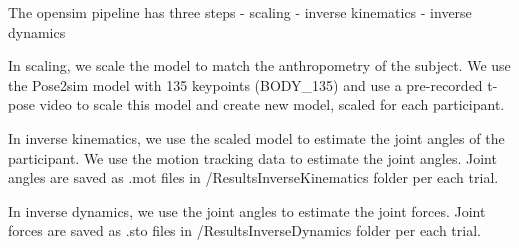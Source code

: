 \documentclass[
  letterpaper,
  DIV=11,
  numbers=noendperiod]{scrreprt}
\begin{document}
The opensim pipeline has three steps - scaling - inverse kinematics -
inverse dynamics

In scaling, we scale the model to match the anthropometry of the
subject. We use the Pose2sim model with 135 keypoints (BODY\_135) and
use a pre-recorded t-pose video to scale this model and create new
model, scaled for each participant.

In inverse kinematics, we use the scaled model to estimate the joint
angles of the participant. We use the motion tracking data to estimate
the joint angles. Joint angles are saved as .mot files in
/ResultsInverseKinematics folder per each trial.

In inverse dynamics, we use the joint angles to estimate the joint
forces. Joint forces are saved as .sto files in /ResultsInverseDynamics
folder per each trial.
\end{document}
